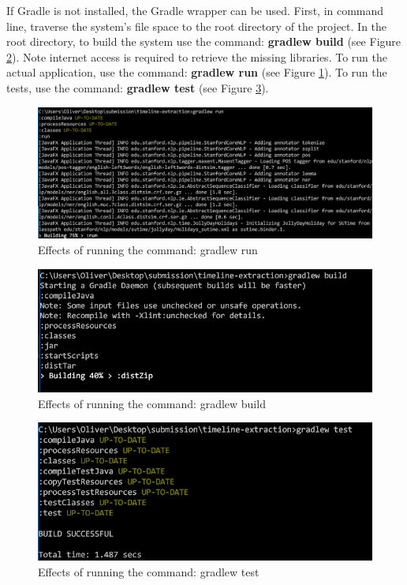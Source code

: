 \par If Gradle is not installed, the Gradle wrapper can be used. First, in command line, traverse the system's file space to the root directory of the project. In the root directory, to build the system use the command: \textbf{gradlew build} (see Figure \ref{fig:gradlewBuild}). Note internet access is required to retrieve the missing libraries. To run the actual application, use the command: \textbf{gradlew run} (see Figure \ref{fig:gradlewRun}). To run the tests, use the command: \textbf{gradlew test} (see Figure \ref{fig:gradlewTest}).

\begin{figure}[H]
\caption{Effects of running the command: gradlew run}
\label{fig:gradlewRun}
\includegraphics[width=\linewidth]{gradlewRun.PNG}
\centering
\end{figure}

\begin{figure}[H]
\caption{Effects of running the command: gradlew build}
\label{fig:gradlewBuild}
\includegraphics{downloadingLibraries.PNG}
\centering
\end{figure}

\begin{figure}[H]
\caption{Effects of running the command: gradlew test}
\label{fig:gradlewTest}
\includegraphics{gradlewTest.PNG}
\centering
\end{figure}

